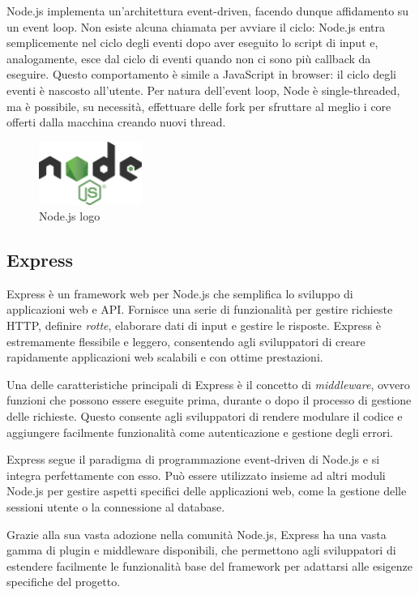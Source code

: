 Node.js implementa un'architettura event-driven, facendo dunque affidamento su un event loop. Non esiste alcuna chiamata per avviare il ciclo: Node.js entra semplicemente nel ciclo degli eventi dopo aver eseguito lo script di input e, analogamente, esce dal ciclo di eventi quando non ci sono più callback da eseguire. Questo comportamento è simile a JavaScript in browser: il ciclo degli eventi è nascosto all'utente.
Per natura dell'event loop, Node è single-threaded, ma è possibile, su necessità, effettuare delle fork per sfruttare al meglio i core offerti dalla macchina creando nuovi thread.

\begin{figure}[H]
\centering
\includegraphics[width=0.3\textwidth]{img/logos/nodejs_logo.png}
\caption{Node.js logo}
\label{fig:nodejs}
\end{figure}

\subsection{Express}
Express è un framework web per Node.js che semplifica lo sviluppo di applicazioni web e API. Fornisce una serie di funzionalità per gestire richieste HTTP, definire \emph{rotte}, elaborare dati di input e gestire le risposte. Express è estremamente flessibile e leggero, consentendo agli sviluppatori di creare rapidamente applicazioni web scalabili e con ottime prestazioni.

Una delle caratteristiche principali di Express è il concetto di \emph{middleware}, ovvero funzioni che possono essere eseguite prima, durante o dopo il processo di gestione delle richieste. Questo consente agli sviluppatori di rendere modulare il codice e aggiungere facilmente funzionalità come autenticazione e gestione degli errori.

Express segue il paradigma di programmazione event-driven di Node.js e si integra perfettamente con esso. Può essere utilizzato insieme ad altri moduli Node.js per gestire aspetti specifici delle applicazioni web, come la gestione delle sessioni utente o la connessione al database.

Grazie alla sua vasta adozione nella comunità Node.js, Express ha una vasta gamma di plugin e middleware disponibili, che permettono agli sviluppatori di estendere facilmente le funzionalità base del framework per adattarsi alle esigenze specifiche del progetto.

